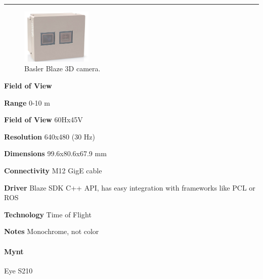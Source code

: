 \documentclass[../main.tex]{subfiles}
\begin{document}
\noindent\rule{8cm}{0.1pt}
\begin{figure}[H]
    \centering
    \includegraphics[width=0.3\textwidth]{images/basler_blaze_tof.png}
    \caption{Basler Blaze 3D camera.}
    \label{fig:basler_blaze_tof}
\end{figure}
\begin{labeling}{\textbf{Field of View    }}
    \setlength{\itemindent}{2em}
    \item [\textbf{Range}] 0-10 m
    \item [\textbf{Field of View}] 60Hx45V
    \item [\textbf{Resolution}] 640x480 (30 Hz)
    \item [\textbf{Dimensions}] 99.6x80.6x67.9 mm
    \item [\textbf{Connectivity}] M12 GigE cable
    \item [\textbf{Driver}] Blaze SDK C++ API, has easy integration with frameworks like PCL or ROS
    \item [\textbf{Technology}] Time of Flight
    \item [\textbf{Notes}] Monochrome, not color
\end{labeling}
\vspace{1em}
\paragraph{\large \textbf{Mynt}} {\large Eye S210}
\end{document}
